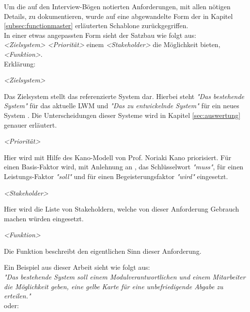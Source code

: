 Um die auf den Interview-Bögen notierten Anforderungen, mit allen nötigen Details, zu dokumentieren, wurde auf eine abgewandelte Form der in Kapitel \ref{subsec:functionmaster} erläuterten Schablone zurückgegriffen. \\

In einer etwas angepassten Form sieht der Satzbau wie folgt aus:\\

\textit{<Zielsystem> <Priorität>} einem \textit{<Stakeholder>} die Möglichkeit bieten, \textit{<Funktion>}.\\

Erklärung:
\begin{description}
\item \textit{<Zielsystem>}

Das Zielsystem stellt das referenzierte System dar. Hierbei steht \textit{"Das bestehende System"} für das aktuelle \ac{LWM} und \textit{"Das zu entwickelnde System"} für ein neues System . Die Unterscheidungen dieser Systeme wird in Kapitel \ref{sec:auswertung} genauer erläutert. 

\item \textit{<Priorität>}

Hier wird mit Hilfe des Kano-Modell von Prof. Noriaki Kano priorisiert. Für einen Basis-Faktor wird, mit Anlehnung an \cite{Rupp14}, das Schlüsselwort \textit{"muss"}, für einen Leistungs-Faktor \textit{"soll"} und für einen Begeisterungsfaktor \textit{"wird"} eingesetzt. 

\item \textit{<Stakeholder>}

Hier wird die Liste von Stakeholdern, welche von dieser Anforderung Gebrauch machen würden eingesetzt.

\item \textit{<Funktion>}

Die Funktion beschreibt den eigentlichen Sinn dieser Anforderung.

\end{description}

Ein Beispiel aus dieser Arbeit sieht wie folgt aus:\\

\textit{"Das bestehende System soll einem Modulverantwortlichen und einem Mitarbeiter die Möglichkeit geben, eine gelbe Karte für eine unbefriedigende Abgabe zu erteilen."}\\

oder:\\

